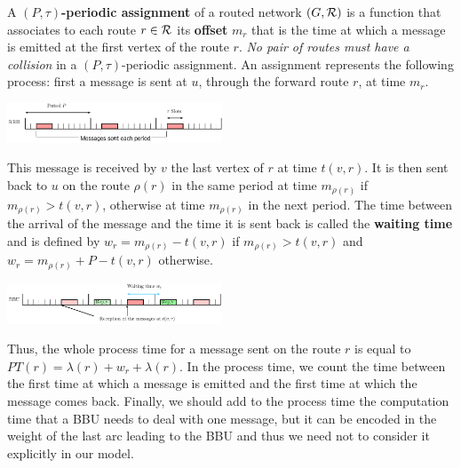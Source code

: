 \documentclass[10pt, conference, letterpaper]{IEEEtran}
\begin{document}
         A {\bf $(P,\tau)$-periodic assignment} of a routed network $(G,\cal R)$ is a function that associates to each route 
         $r \in \cal R$ its \textbf{offset} $m_r$ that is the time at which a message is emitted at the first vertex of the route $r$. \emph{No pair of routes must have a collision} in a $(P,\tau)$-periodic assignment.
	 An assignment represents the following process: first a message is sent at $u$, through the forward route $r$, at time $m_r$.
      \begin{center}
     \hspace{-0.5cm} \includegraphics[width=0.48\textwidth]{rrh.pdf}
      \end{center}

      This message is received by $v$ the last vertex of $r$ at time $t(v,r)$. It is then sent back to $u$ on the route $\rho(r)$ in the same period at time $m_{\rho(r)}$ if $m_{\rho(r)} > t(v,r)$, otherwise at time $m_{\rho(r)}$ in the next period. The time between the arrival of the message and the time it is sent back is called the \textbf{waiting time} and is defined by $w_r = m_{\rho(r)} - t(v,r)$ if $m_{\rho(r)} > t(v,r)$ and $w_r = m_{\rho(r)} + P - t(v,r)$ otherwise.
 
       \begin{center}
     \hspace{-0.5cm} \includegraphics[width=0.48\textwidth]{BBU.pdf}
      \end{center}
     
    
      Thus, the whole process time for a message sent on the route $r$ is equal to
      $PT(r)=\lambda(r)+ w_r+\lambda(r)$.      
      In the process time, we count the time between the first time at which a message is emitted and the first time at which the message comes back. 
      Finally, we should add to the process time the computation time that a BBU needs to deal with one message, but it can be encoded  in the weight of the last arc leading to the BBU and thus we need not to consider it explicitly in our model.
\end{document}
